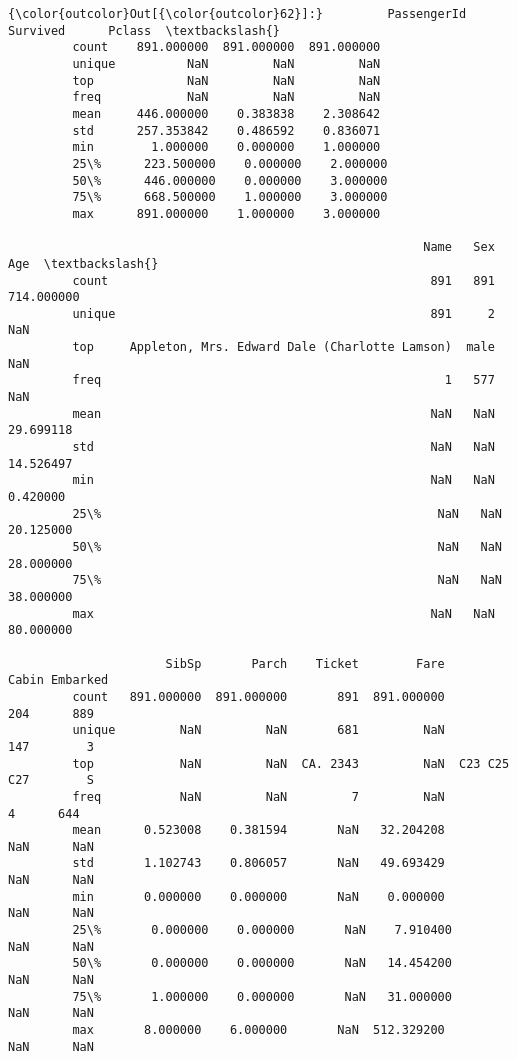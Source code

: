 \documentclass[11pt]{article}
\begin{document}
\begin{Verbatim}[commandchars=\\\{\}]
{\color{outcolor}Out[{\color{outcolor}62}]:}         PassengerId    Survived      Pclass  \textbackslash{}
         count    891.000000  891.000000  891.000000   
         unique          NaN         NaN         NaN   
         top             NaN         NaN         NaN   
         freq            NaN         NaN         NaN   
         mean     446.000000    0.383838    2.308642   
         std      257.353842    0.486592    0.836071   
         min        1.000000    0.000000    1.000000   
         25\%      223.500000    0.000000    2.000000   
         50\%      446.000000    0.000000    3.000000   
         75\%      668.500000    1.000000    3.000000   
         max      891.000000    1.000000    3.000000   
         
                                                          Name   Sex         Age  \textbackslash{}
         count                                             891   891  714.000000   
         unique                                            891     2         NaN   
         top     Appleton, Mrs. Edward Dale (Charlotte Lamson)  male         NaN   
         freq                                                1   577         NaN   
         mean                                              NaN   NaN   29.699118   
         std                                               NaN   NaN   14.526497   
         min                                               NaN   NaN    0.420000   
         25\%                                               NaN   NaN   20.125000   
         50\%                                               NaN   NaN   28.000000   
         75\%                                               NaN   NaN   38.000000   
         max                                               NaN   NaN   80.000000   
         
                      SibSp       Parch    Ticket        Fare        Cabin Embarked  
         count   891.000000  891.000000       891  891.000000          204      889  
         unique         NaN         NaN       681         NaN          147        3  
         top            NaN         NaN  CA. 2343         NaN  C23 C25 C27        S  
         freq           NaN         NaN         7         NaN            4      644  
         mean      0.523008    0.381594       NaN   32.204208          NaN      NaN  
         std       1.102743    0.806057       NaN   49.693429          NaN      NaN  
         min       0.000000    0.000000       NaN    0.000000          NaN      NaN  
         25\%       0.000000    0.000000       NaN    7.910400          NaN      NaN  
         50\%       0.000000    0.000000       NaN   14.454200          NaN      NaN  
         75\%       1.000000    0.000000       NaN   31.000000          NaN      NaN  
         max       8.000000    6.000000       NaN  512.329200          NaN      NaN  
\end{Verbatim}
            
\end{document}
